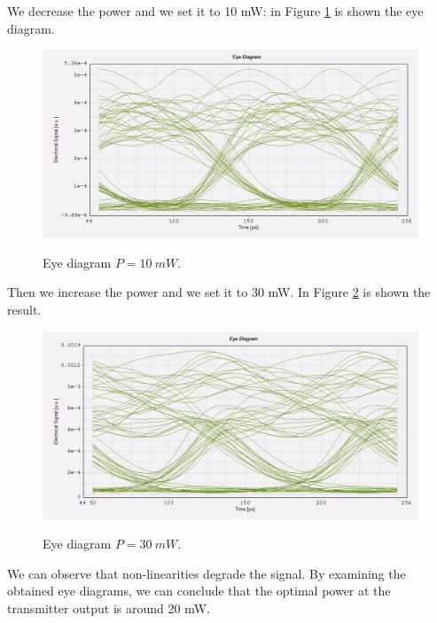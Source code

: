 \documentclass[a4paper,10pt]{report}
\begin{document}
We decrease the power and we set it to 10 mW: in Figure \ref{q2_2} is shown the eye diagram.
\begin{figure}[!ht]
   \centering
   \includegraphics[width=12cm]{q2_2.png}\\
   \caption{Eye diagram $P=10 \ mW$.}
   \label{q2_2}
\end{figure}

Then we increase the power and we set it to 30 mW. In Figure \ref{q2_3} is shown the result.
\begin{figure}[!ht]
   \centering
   \includegraphics[width=12cm]{q2_3.png}\\
   \caption{Eye diagram $P=30 \ mW$.}
   \label{q2_3}
\end{figure}

We can observe that non-linearities degrade the signal.
By examining the obtained eye diagrams, we can conclude that the optimal power at the transmitter output is around 20 mW.


\end{document}
